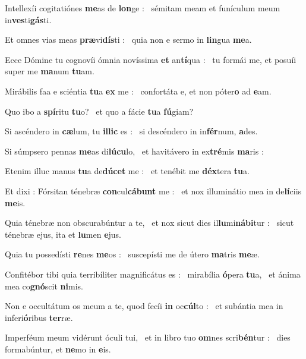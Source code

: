 \documentclass[12pt]{article} %
\newenvironment{psalmtext}{\leftskip 0.25in}{\vspace{2 mm}}
\let\oldgresixstar\gresixstar
\renewcommand{\gresixstar}{\textcolor{benred8}{\oldgresixstar}}
\let\oldgredagger\gredagger
\renewcommand{\gredagger}{\textcolor{benred8}{\oldgredagger}}
\begin{document}
\begin{psalmtext}
Intellexíi cogitatiónes \textbf{me}as de \textbf{lon}ge : \gresixstar\ sémitam meam et funículum meum in\textbf{ves}ti\textbf{gás}ti.

Et omnes vias meas \textbf{præ}vi\textbf{dís}ti : \gresixstar\ quia non e sermo in \textbf{lin}gua \textbf{me}a.

Ecce Dómine tu cognovíi ómnia novíssima \textbf{et} an\textbf{tí}qua : \gresixstar\ tu formái me, et posuíi super me \textbf{ma}num \textbf{tu}am.

Mirábilis faa e sciéntia \textbf{tu}a \textbf{ex} me : \gresixstar\ confortáta e, et non póter\textbf{o} ad \textbf{e}am.

Quo ibo a \textbf{spí}ritu \textbf{tu}o? \gresixstar\ et quo a fácie \textbf{tu}a \textbf{fú}giam?

Si ascéndero in \textbf{cæ}lum, tu \textbf{illic} es : \gresixstar\ si descéndero in in\textbf{fér}num, \textbf{a}des.

Si súmpsero pennas \textbf{me}as di\textbf{lúcu}lo, \gresixstar\ et havitávero in ex\textbf{tré}mis \textbf{ma}ris :

Etenim illuc manus \textbf{tu}a de\textbf{dúcet} me : \gresixstar\ et tenébit me \textbf{déx}tera \textbf{tu}a.

Et dixi : Fórsitan ténebræ \textbf{con}cul\textbf{cábunt} me : \gresixstar\ et nox illuminátio mea in de\textbf{lí}ciis \textbf{me}is.

Quia ténebræ non obscurabúntur a te, \gredagger\ et nox sicut dies il\textbf{lu}mi\textbf{nábi}tur : \gresixstar\ sicut ténebræ ejus, ita et \textbf{lu}men \textbf{e}jus.

Quia tu possed\'{i}sti \textbf{re}nes \textbf{me}os : \gresixstar\ suscep\'{i}sti me de \'{u}tero \textbf{ma}tris \textbf{me}\ae .

Confitébor tibi quia terribíliter magnificátus es : \gredagger\ mirabília \textbf{ó}pera \textbf{tu}a, \gresixstar\ et ánima mea co\textbf{gnó}scit \textbf{ni}mis.

Non e occultátum os meum a te, quod fecíi \textbf{in} oc\textbf{cúl}to : \gresixstar\ et subántia mea in inferi\textbf{ó}ribus \textbf{ter}ræ.

Imperféum meum vidérunt óculi tui, \gredagger\ et in libro tuo \textbf{om}nes scri\textbf{bén}tur : \gresixstar\ dies formabúntur, et \textbf{ne}mo in \textbf{e}is.


\end{psalmtext}
\end{document}
